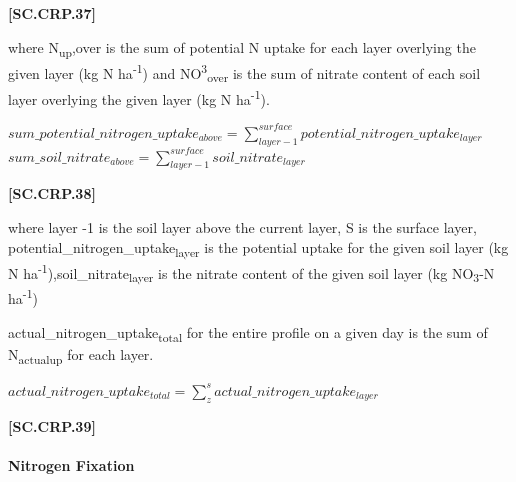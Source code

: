             {\raggedleft \textbf{[SC.CRP.37]}\par}
            \vspace{0.5cm}

where N\textsubscript{up},over is the sum of potential N uptake for each layer overlying the given layer (kg N ha\textsuperscript{-1}) and NO\textsuperscript{3}\textsubscript{over} is the sum of nitrate content of each soil layer overlying the given layer (kg N ha\textsuperscript{-1}).
   \vspace{0.2cm}

    \begin{center}
        \(sum\_potential\_nitrogen\_uptake_{above}=\displaystyle \sum_{layer-1}^{surface}potential\_nitrogen\_uptake_{layer}\) \\
        \(sum\_soil\_nitrate_{above}=\displaystyle \sum_{layer-1}^{surface}soil\_nitrate_{layer}\)
    \end{center}
        \vspace{0.5cm}
    
            {\raggedleft \textbf{[SC.CRP.38]}\par}
            \vspace{0.5cm}

where layer -1 is the soil layer above the current layer, S is the surface layer, potential\_nitrogen\_uptake\textsubscript{layer} is the potential uptake for the given soil layer (kg N ha\textsuperscript{-1}),soil\_nitrate\textsubscript{layer} is the nitrate content of the given soil layer (kg NO\textsubscript{3}-N ha\textsuperscript{-1})

actual\_nitrogen\_uptake\textsubscript{total} for the entire profile on a given day is the sum of N\textsubscript{actualup} for each layer.
   \vspace{0.2cm}

    \begin{center}
        \(actual\_nitrogen\_uptake_{total}=\displaystyle \sum_{z}^{s}actual\_nitrogen\_uptake_{layer}\) 
    \end{center}
        \vspace{0.5cm}
    
            {\raggedleft \textbf{[SC.CRP.39]}\par}
            \vspace{0.5cm}

\paragraph{Nitrogen Fixation}
\vspace{-0.25cm}

